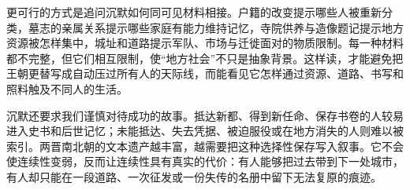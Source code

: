 更可行的方式是追问沉默如何同可见材料相接。户籍的改变提示哪些人被重新分类，墓志的亲属关系提示哪些家庭有能力维持记忆，寺院供养与造像题记提示地方资源被怎样集中，城址和道路提示军队、市场与迁徙面对的物质限制。每一种材料都不完整，但它们相互限制，使“地方社会”不只是抽象背景。这样读，才能避免把王朝更替写成自动压过所有人的天际线，而能看见它怎样通过资源、道路、书写和照料触及不同人的生活。

沉默还要求我们谨慎对待成功的故事。抵达新都、得到新任命、保存书卷的人较易进入史书和后世记忆；未能抵达、失去凭据、被迫服役或在地方消失的人则难以被索引。两晋南北朝的文本遗产越丰富，越需要把这种选择性保存写入叙事。它不会使连续性变弱，反而让连续性具有真实的代价：有人能够把过去带到下一处城市，有人却只能在一段道路、一次征发或一份失传的名册中留下无法复原的痕迹。
